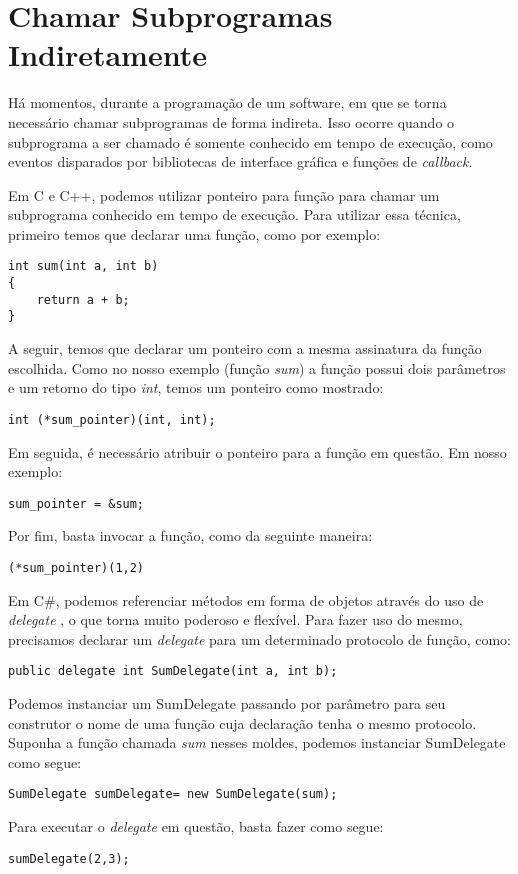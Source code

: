 \section{Chamar Subprogramas Indiretamente} %
\label{sec:chamar_subprogramas_indiretamente}
Há momentos, durante a programação de um software, em que se torna necessário chamar subprogramas de forma indireta. Isso ocorre quando o subprograma a ser chamado é somente conhecido em tempo de execução, como eventos disparados por bibliotecas de interface gráfica e funções de \textit{callback}.

Em C e C++, podemos utilizar ponteiro para função para chamar um subprograma conhecido em tempo de execução. Para utilizar essa técnica, primeiro temos que declarar uma função, como por exemplo:
\begin{verbatim}
int sum(int a, int b)
{
	return a + b;
}
\end{verbatim}

A seguir, temos que declarar um ponteiro com a mesma assinatura da função escolhida. Como no nosso exemplo (função \textit{sum}) a função possui dois parâmetros e um retorno do tipo \emph{int}, temos um ponteiro como mostrado:
\begin{verbatim}
int (*sum_pointer)(int, int);
\end{verbatim}

Em seguida, é necessário atribuir o ponteiro para a função em questão. Em nosso exemplo:
\begin{verbatim}
sum_pointer = &sum;
\end{verbatim}

Por fim, basta invocar a função, como da seguinte maneira:
\begin{verbatim}
(*sum_pointer)(1,2)	
\end{verbatim}

Em C\#, podemos referenciar métodos em forma de objetos através do uso de \emph{delegate} \cite{sebesta}\cite{delegate}, o que torna muito poderoso e flexível. Para fazer uso do mesmo, precisamos declarar um \emph{delegate} para um determinado protocolo de função, como:
\begin{verbatim}
public delegate int SumDelegate(int a, int b);
\end{verbatim}

Podemos instanciar um SumDelegate passando por parâmetro para seu construtor o nome de uma função cuja declaração tenha o mesmo protocolo. Suponha a função chamada \textit{sum} nesses moldes, podemos instanciar SumDelegate como segue:
\begin{verbatim}
SumDelegate sumDelegate= new SumDelegate(sum);
\end{verbatim}

Para executar o \textit{delegate} em questão, basta fazer como segue:
\begin{verbatim}
sumDelegate(2,3);
\end{verbatim}
